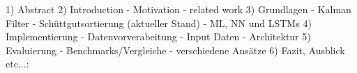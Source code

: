 

1) Abstract 
2) Introduction
	- Motivation
	- related work
3) Grundlagen
	- Kalman Filter
	- Schüttgutsortierung (aktueller Stand)
	- ML, NN und LSTMs
4) Implementierung
	- Datenvorverabeitung
	- Input Daten
	- Architektur
5) Evaluierung
	- Benchmarks/Vergleiche
	- verschiedene Ansätze
6) Fazit, Ausblick etc...: